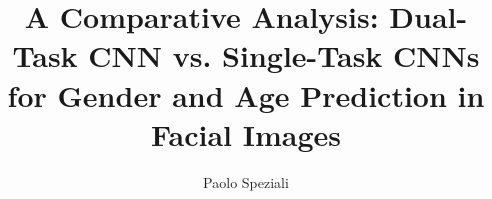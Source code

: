 \documentclass[letterpaper, 10 pt, journal, twoside]{IEEEtran}
\begin{document}
\title{A Comparative Analysis: Dual-Task CNN vs. Single-Task CNNs for Gender and Age Prediction in Facial Images}


\author{Paolo Speziali \\ ~}


\maketitle


\IEEEpeerreviewmaketitle








\end{document}
